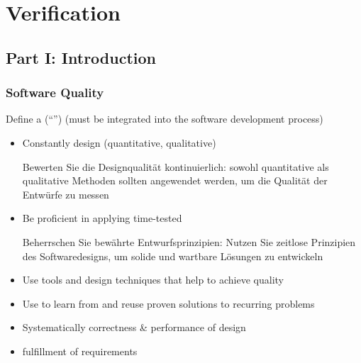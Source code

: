 \section{Verification}
\subsection{Part I: Introduction}
\subsubsection*{Software Quality}
\begin{defBox}[title=How to assure software quality? The big picture]
    Define a  (\enquote{}) (must be integrated into the software development process)
    \begin{itemize}
        \item Constantly  design  (quantitative, qualitative)
        \begin{infoBox}
            Bewerten Sie die Designqualität kontinuierlich: sowohl quantitative als qualitative Methoden sollten angewendet werden, um die Qualität der Entwürfe zu messen
        \end{infoBox}
        \item Be proficient in applying time-tested 
        \begin{infoBox}
            Beherrschen Sie bewährte Entwurfsprinzipien: Nutzen Sie zeitlose Prinzipien des Softwaredesigns, um solide und wartbare Lösungen zu entwickeln
        \end{infoBox}
        \item Use tools and design techniques that help to achieve quality
        \item Use  to learn from and reuse proven solutions to recurring problems
        \item Systematically  correctness \& performance of design
        \item {} fulfillment of requirements
    \end{itemize}
\end{defBox}
